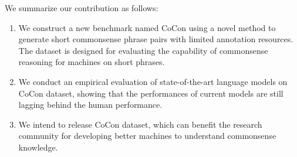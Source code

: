We summarize our contribution as follows:
\begin{enumerate}
	\item We construct a new benchmark named CoCon using a novel method to generate short commonsense phrase pairs with limited annotation resources. The dataset is designed
	for evaluating %
	the capability of commonsense reasoning for machines on short phrases.
	\item We conduct an empirical evaluation of state-of-the-art language models on CoCon dataset, showing that the performances of current models  are still lagging behind the human performance.
	\item We intend to release CoCon dataset, which can  benefit the research community %
	for developing better machines to understand commonsense knowledge.
\end{enumerate}

